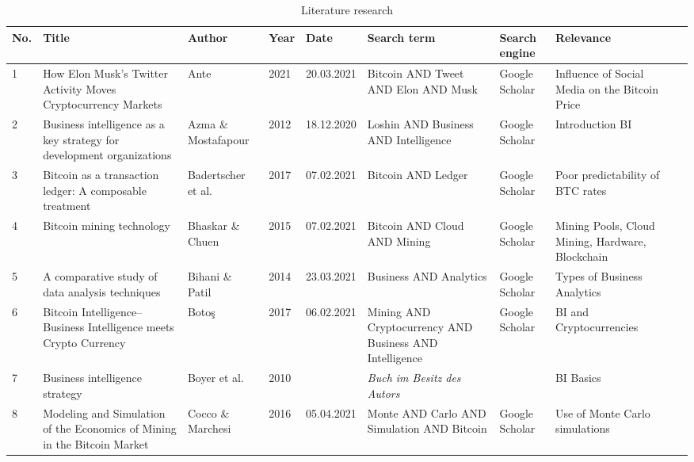 \begin{table}[H]
	\caption{Literature research}
	\label{tbl:suchprozessergebnis}
	\scriptsize
  	\begin{tabularx}{\textwidth}[ht]{|l|X|X|l|l|X|l|X|X|}
		\hline
		\textbf{No.} & \textbf{Title} & \textbf{Author} & \textbf{Year} & \textbf{Date} & \textbf{Search term} & \textbf{Search engine} & \textbf{Relevance} \\
		\hline\hline
		1 & How Elon Musk’s Twitter Activity Moves Cryptocurrency Markets & Ante & 2021 & 20.03.2021 & Bitcoin AND Tweet AND Elon AND Musk & Google Scholar & Influence of Social Media on the Bitcoin Price \\
		\hline
		2 & Business intelligence as a key strategy for development organizations & Azma \& Mostafapour & 2012 & 18.12.2020 & Loshin AND Business AND Intelligence & Google Scholar & Introduction BI \\
		\hline
		3 & Bitcoin as a transaction ledger: A composable treatment & Badertscher et al. & 2017 & 07.02.2021 & Bitcoin AND Ledger & Google Scholar & Poor predictability of BTC rates \\
		\hline
		4 & Bitcoin mining technology & Bhaskar \& Chuen & 2015 & 07.02.2021 & Bitcoin AND Cloud AND Mining & Google Scholar & Mining Pools, Cloud Mining, Hardware, Blockchain \\
		\hline
		5 & A comparative study of data analysis techniques & Bihani \& Patil & 2014 & 23.03.2021 & Business AND Analytics & Google Scholar & Types of Business Analytics \\
		\hline
		6 & Bitcoin Intelligence–Business Intelligence meets Crypto Currency & Boto{\c{s}} & 2017 & 06.02.2021 & Mining AND Cryptocurrency AND Business AND Intelligence & Google Scholar & BI and Cryptocurrencies \\
		\hline
		7 & Business intelligence strategy & Boyer et al. & 2010 &  & \textit{Buch im Besitz des Autors} & & BI Basics \\
		\hline
		8 & Modeling and Simulation of the Economics of Mining in the Bitcoin Market & Cocco \& Marchesi & 2016 & 05.04.2021 & Monte AND Carlo AND Simulation AND Bitcoin & Google Scholar & Use of Monte Carlo simulations \\
		\hline
	\end{tabularx}
\end{table}

